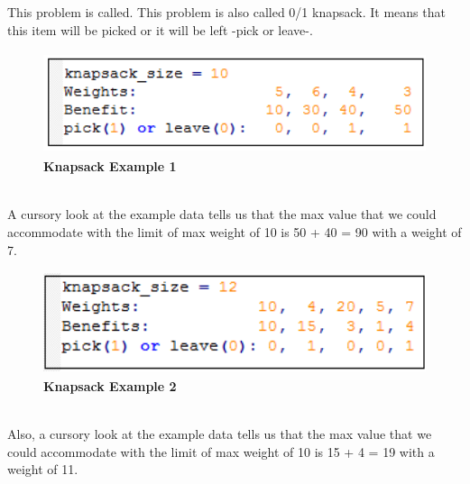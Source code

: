 \hspace{7mm}This problem is called.  This problem is also called 0/1 knapsack. It means that this item will be picked or it will be left -pick or leave-.
\newpage
\begin{figure}[h]
    \centering
\includegraphics[width=14cm, height=3cm]{knapsack-example-1.png}
 \caption{\textbf{Knapsack Example 1}}
    \label{fig:knapsack-example-1}
\end{figure}
\\
\hspace{7mm}A cursory look at the example data tells us that the max value that we could accommodate with the limit of max weight of 10 is 50 + 40 = 90 with a weight of 7. 

\begin{figure}[h]
    \centering
\includegraphics[width=14cm, height=3cm]{knapsack-example-2.png}
 \caption{\textbf{Knapsack Example 2}}
    \label{fig:knapsack-example-2}
\end{figure}
\\
\hspace{7mm}Also, a cursory look at the example data tells us that the max value that we could accommodate with the limit of max weight of 10 is 15 + 4 = 19 with a weight of 11.
